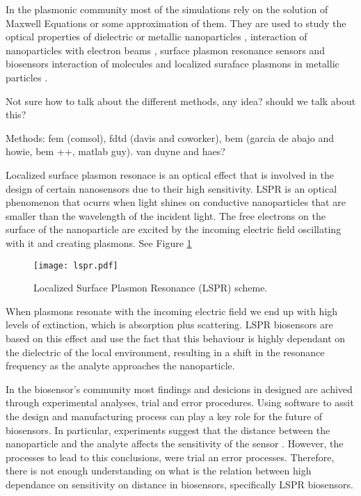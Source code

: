 In the plasmonic community most of the simulations rely on the solution of 
Maxwell Equations or some approximation of them. They are used to study the 
optical properties of dielectric or metallic nanoparticles \cite{Hohenester2018
JungPedersenSondergaardPedersenLarsenNielsen2010, VideenSun2003,
MayergoyzFredkinZhang2005, MayergoyzZhang2007}, interaction of nanoparticles
with electron beams \cite{GarciadeabajoAizpurua1997, GarciadeabajoHowie2002},
surface plasmon resonance sensors \cite{JungCampbellChinowskyMarYee1998} and
biosensors \cite{HaesETal2004, HaesVanduyne2002} interaction of molecules and
localized suraface plasmons in metallic particles \cite{DavisGomezVernon2010,
AntosiewiczApellClaudioKall2011}.

{\color{red} Not sure how to talk about the different methods, any idea? should
we talk about this? 

Methods: fem (comsol), fdtd (davis and coworker), bem (garcia de abajo and 
howie, bem ++, matlab guy). van duyne and haes? }

Localized surface plasmon resonace is an optical effect that is involved in the
design of certain nanosensors due to their high sensitivity. LSPR is an 
optical phenomenon that ocurrs when light shines on conductive nanoparticles
that are smaller than the wavelength of the incident light. The free electrons
on the surface of the nanoparticle are excited by the incoming electric field
oscillating with it and creating plasmons. See Figure \ref{fig:lspr}

\begin{figure}[h] %
   \centering
   \texttt{[image: lspr.pdf]} 
   \caption{Localized Surface Plasmon Resonance (LSPR) scheme. }
   \label{fig:lspr}
\end{figure}

When plasmons resonate with the incoming electric field we end up with high 
levels of extinction, which is absorption plus scattering. LSPR biosensors are 
based on this effect and use the fact that this behaviour is highly dependant
on the dielectric of the local environment, resulting in a shift in the 
resonance frequency as the analyte approaches the nanoparticle.  


In the biosensor's community most findings and desicions in designed are achived 
through experimental analyses, trial and error procedures. Using software to 
assit the design and manufacturing process can play a key role for the future
of biosensors. In particular, experiments suggest that the distance between the
nanoparticle and the analyte affects the sensitivity of the sensor
\cite{HaesETal2004}. However, the processes to lead to this conclusions, were 
trial an error processes. Therefore, there is not enough understanding on what 
is the relation between high dependance on sensitivity on distance in 
biosensors, specifically LSPR biosensors.

